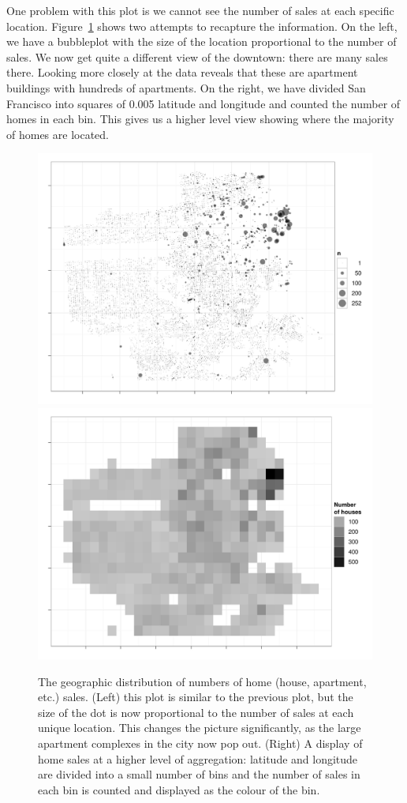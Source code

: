 \documentclass[oneside]{article}
\begin{document}
One problem with this plot is we cannot see the number of sales at each specific location. Figure~\ref{fig:sf-n} shows two attempts to recapture the information. On the left, we have a bubbleplot with the size of the location proportional to the number of sales. We now get quite a different view of the downtown: there are many sales there. Looking more closely at the data reveals that these are apartment buildings with hundreds of apartments. On the right, we have divided San Francisco into squares of 0.005 latitude and longitude and counted the number of homes in each bin. This gives us a higher level view showing where the majority of homes are located.

\begin{figure}[htbp]
  \centering
    \includegraphics[width=0.5\linewidth]{sf-geo-n}%
    \includegraphics[width=0.5\linewidth]{sf-bin-n}
  \caption{The geographic distribution of numbers of home (house, apartment, etc.) sales.  (Left) this plot is similar to the previous plot, but the size of the dot is now proportional to the number of sales at each unique location.  This changes the picture significantly, as the large apartment complexes in the city now pop out.  (Right) A display of home sales at a higher level of aggregation: latitude and longitude are divided into a small number of bins and the number of sales in each bin is counted and displayed as the colour of the bin.}
  \label{fig:sf-n}
\end{figure}
\end{document}
